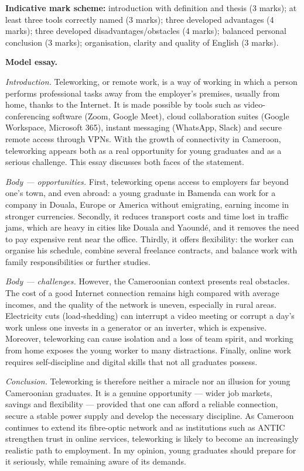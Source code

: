 \documentclass[11pt]{article}
\begin{document}
\begin{corrige}
\textbf{Indicative mark scheme:} introduction with definition and thesis (3 marks); at least three tools correctly named (3 marks); three developed advantages (4 marks); three developed disadvantages/obstacles (4 marks); balanced personal conclusion (3 marks); organisation, clarity and quality of English (3 marks).\par\medskip
\textbf{Model essay.}\par\medskip
\emph{Introduction.} Teleworking, or remote work, is a way of working in which a person performs professional tasks away from the employer's premises, usually from home, thanks to the Internet. It is made possible by tools such as video-conferencing software (Zoom, Google Meet), cloud collaboration suites (Google Workspace, Microsoft 365), instant messaging (WhatsApp, Slack) and secure remote access through VPNs. With the growth of connectivity in Cameroon, teleworking appears both as a real opportunity for young graduates and as a serious challenge. This essay discusses both faces of the statement.\par\medskip
\emph{Body — opportunities.} First, teleworking opens access to employers far beyond one's town, and even abroad: a young graduate in Bamenda can work for a company in Douala, Europe or America without emigrating, earning income in stronger currencies. Secondly, it reduces transport costs and time lost in traffic jams, which are heavy in cities like Douala and Yaoundé, and it removes the need to pay expensive rent near the office. Thirdly, it offers flexibility: the worker can organise his schedule, combine several freelance contracts, and balance work with family responsibilities or further studies.\par\medskip
\emph{Body — challenges.} However, the Cameroonian context presents real obstacles. The cost of a good Internet connection remains high compared with average incomes, and the quality of the network is uneven, especially in rural areas. Electricity cuts (load-shedding) can interrupt a video meeting or corrupt a day's work unless one invests in a generator or an inverter, which is expensive. Moreover, teleworking can cause isolation and a loss of team spirit, and working from home exposes the young worker to many distractions. Finally, online work requires self-discipline and digital skills that not all graduates possess.\par\medskip
\emph{Conclusion.} Teleworking is therefore neither a miracle nor an illusion for young Cameroonian graduates. It is a genuine opportunity — wider job markets, savings and flexibility — provided that one can afford a reliable connection, secure a stable power supply and develop the necessary discipline. As Cameroon continues to extend its fibre-optic network and as institutions such as ANTIC strengthen trust in online services, teleworking is likely to become an increasingly realistic path to employment. In my opinion, young graduates should prepare for it seriously, while remaining aware of its demands.
\end{corrige}
\end{document}
